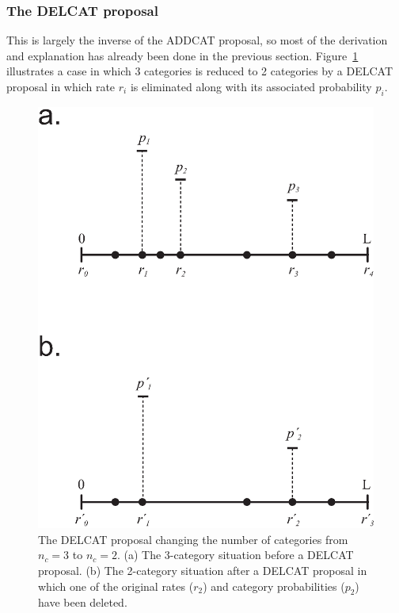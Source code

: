 \documentclass[12pt]{article}
\newcommand{\ncat}{n_c}
\begin{document}
\subsubsection{The DELCAT proposal}

This is largely the inverse of the ADDCAT proposal, so most of the derivation and explanation has already been done in the previous section. Figure~\ref{delcat} illustrates a case in which 3 categories is reduced to 2 categories by a DELCAT proposal in which rate $r_i$ is eliminated along with its associated probability $p_i$.

%
%
\begin{figure}
\centering
\hfil\includegraphics[scale=0.7]{delcat.eps}\hfil
\caption{The DELCAT proposal changing the number of categories from $\ncat = 3$ to $\ncat = 2$. (a) The 3-category situation before a DELCAT proposal. (b) The 2-category situation after a DELCAT proposal in which one of the original rates ($r_2$) and category probabilities ($p_2$) have been deleted.}
\label{delcat}
\end{figure}
\end{document}
